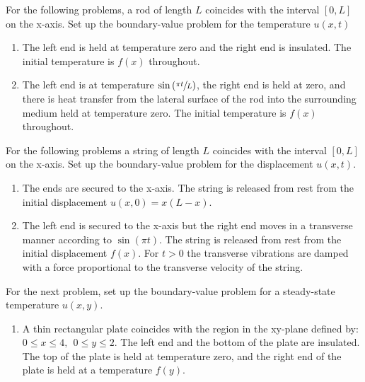 \begin{fullwidth}
\begin{enumerate}[resume]
\end{enumerate}

\vspace{1.0cm}

\noindent For the following problems, a rod of length $L$ coincides with the interval $[0,L]$ on the x-axis.  Set up the boundary-value problem for the temperature $u(x,t)$

\begin{enumerate}[resume]
\item The left end is held at temperature zero and the right end is insulated.  The initial temperature is $f(x)$ throughout.

\vspace{1.0cm}

\item The left end is at temperature $\sin{\left(\sfrac{\pi t}{L} \right)}$, the right end is held at zero, and there is heat transfer from the lateral surface of the rod into the surrounding medium held at temperature zero.  The initial temperature is $f(x)$ throughout.
\end{enumerate}

\vspace{1.0cm}

\noindent For the following problems a string of length $L$ coincides with the interval $[0,L]$ on the x-axis.  Set up the boundary-value problem for the displacement $u(x,t)$.

\begin{enumerate}[resume]
\item The ends are secured to the x-axis. The string is released from rest from the initial displacement $u(x,0) = x(L-x)$.  

\vspace{1.0cm}

\item The left end is secured to the x-axis but the right end moves in a transverse manner according to $\sin{(\pi t)}$.  The string is released from rest from the initial displacement $f(x)$.  For $t>0$ the transverse vibrations are damped with a force proportional to the transverse velocity of the string.
\end{enumerate}


\vspace{1.0cm}

\noindent For the next problem, set up the boundary-value problem for a steady-state temperature $u(x,y)$. 

\begin{enumerate}[resume]
\item A thin rectangular plate coincides with the region in the xy-plane defined by: $0\le x \le 4, \ \ 0 \le y \le 2$.  The left end and the bottom of the plate are insulated.  The top of the plate is held at temperature zero, and the right end of the plate is held at a temperature $f(y)$. 
\end{enumerate}

\end{fullwidth}
